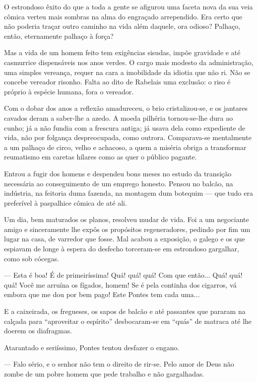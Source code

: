 O estrondoso êxito do que a toda a gente se afigurou uma faceta nova da
sua veia cômica verteu mais sombras na alma do engraçado arrependido.
Era certo que não poderia traçar outro caminho na vida além daquele, ora
odioso? Palhaço, então, eternamente palhaço à força?

Mas a vida de um homem feito tem exigências sisudas, impõe gravidade e
até casmurrice dispensáveis nos anos verdes. O cargo mais modesto da
administração, uma simples vereança, requer na cara a imobilidade da
idiotia que não ri. Não se concebe vereador risonho. Falta ao dito de
Rabelais uma exclusão: o riso é próprio à espécie humana, fora o
vereador.

Com o dobar dos anos a reflexão amadureceu, o brio cristalizou-se, e os
jantares cavados deram a saber-lhe a azedo. A moeda pilhéria
tornou-se-lhe dura ao cunho; já a não fundia com a frescura antiga; já
usava dela como expediente de vida, não por folgança despreocupada, como
outrora. Comparava-se mentalmente a um palhaço de circo, velho e
achacoso, a quem a miséria obriga a transformar reumatismo em caretas
hílares como as quer o público pagante.

Entrou a fugir dos homens e despendeu bons meses no estudo da transição
necessária ao conseguimento de um emprego honesto. Pensou no balcão, na
indústria, na feitoria duma fazenda, na montagem dum botequim --- que
tudo era preferível à paspalhice cômica de até ali.

Um dia, bem maturados os planos, resolveu mudar de vida. Foi a um
negociante amigo e sinceramente lhe expôs os propósitos regeneradores,
pedindo por fim um lugar na casa, de varredor que fosse. Mal acabou a
exposição, o galego e os que espiavam de longe à espera do desfecho
torceram-se em estrondoso gargalhar, como sob cócegas.

--- Esta é boa! É de primeiríssima! Quá! quá! quá! Com que então... Quá!
quá! quá! Você me arruína os fígados, homem! Se é pela continha dos
cigarros, vá embora que me dou por bem pago! Este Pontes tem cada uma...

E a caixeirada, os fregueses, os sapos de balcão e até passantes que
pararam na calçada para ``aproveitar o espírito'' desbocaram-se em
``quás'' de matraca até lhe doerem os diafragmas.

Atarantado e seriíssimo, Pontes tentou desfazer o engano.

--- Falo sério, e o senhor não tem o direito de rir-se. Pelo amor de
Deus não zombe de um pobre homem que pede trabalho e não gargalhadas.

